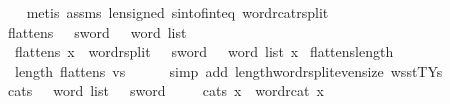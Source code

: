 \begin{isabellebody}
%
\isadelimproof
\ \ %
\endisadelimproof
%
\isatagproof
{}\isamarkupfalse%
\ {\isacharparenleft}{\kern0pt}metis\ assms\ len{\isacharunderscore}{\kern0pt}signed\ sint{\isacharunderscore}{\kern0pt}of{\isacharunderscore}{\kern0pt}int{\isacharunderscore}{\kern0pt}eq\ word{\isacharunderscore}{\kern0pt}rcat{\isacharunderscore}{\kern0pt}rsplit{\isacharparenright}{\kern0pt}%
\endisatagproof
{\isafoldproof}%
%
\isadelimproof
\isanewline
%
\endisadelimproof
\ \ \isanewline
{}\isamarkupfalse%
\ flatten{\isacharunderscore}{\kern0pt}s{}{}\ {\isacharcolon}{\kern0pt}{\isacharcolon}{\kern0pt}\ {\isachardoublequoteopen}{}{}\ sword\ {\isasymRightarrow}\ {}\ word\ list{\isachardoublequoteclose}\isanewline
\ \ \isanewline
\ \ {\isachardoublequoteopen}flatten{\isacharunderscore}{\kern0pt}s{}{}\ x\ {\isasymequiv}\ {\isacharparenleft}{\kern0pt}word{\isacharunderscore}{\kern0pt}rsplit\ {\isacharcolon}{\kern0pt}{\isacharcolon}{\kern0pt}\ {}{}\ sword\ {\isasymRightarrow}\ {}\ word\ list{\isacharparenright}{\kern0pt}\ x{\isachardoublequoteclose}\isanewline
\isanewline
{}\isamarkupfalse%
\ flatten{\isacharunderscore}{\kern0pt}s{}{}{\isacharunderscore}{\kern0pt}length{\isacharcolon}{\kern0pt}\isanewline
\ \ {\isachardoublequoteopen}length\ {\isacharparenleft}{\kern0pt}flatten{\isacharunderscore}{\kern0pt}s{}{}\ vs{\isacharparenright}{\kern0pt}\ {\isacharequal}{\kern0pt}\ {}{\isachardoublequoteclose}\isanewline
%
\isadelimproof
\ \ %
\endisadelimproof
%
\isatagproof
{}\isamarkupfalse%
\ {\isacharparenleft}{\kern0pt}simp\ add{\isacharcolon}{\kern0pt}\ length{\isacharunderscore}{\kern0pt}word{\isacharunderscore}{\kern0pt}rsplit{\isacharunderscore}{\kern0pt}even{\isacharunderscore}{\kern0pt}size\ wsst{\isacharunderscore}{\kern0pt}TYs{\isacharparenleft}{\kern0pt}{}{\isacharparenright}{\kern0pt}{\isacharparenright}{\kern0pt}%
\endisatagproof
{\isafoldproof}%
%
\isadelimproof
\isanewline
%
\endisadelimproof
\isanewline
{}\isamarkupfalse%
\ cat{\isacharunderscore}{\kern0pt}s{}{}\ {\isacharcolon}{\kern0pt}{\isacharcolon}{\kern0pt}\ {\isachardoublequoteopen}{}\ word\ list\ {\isasymRightarrow}\ {}{}\ sword{\isachardoublequoteclose}\isanewline
\ \ \isanewline
\ \ {\isachardoublequoteopen}cat{\isacharunderscore}{\kern0pt}s{}{}\ x\ {\isasymequiv}\ word{\isacharunderscore}{\kern0pt}rcat\ x{\isachardoublequoteclose}\isanewline

\end{isabellebody}
